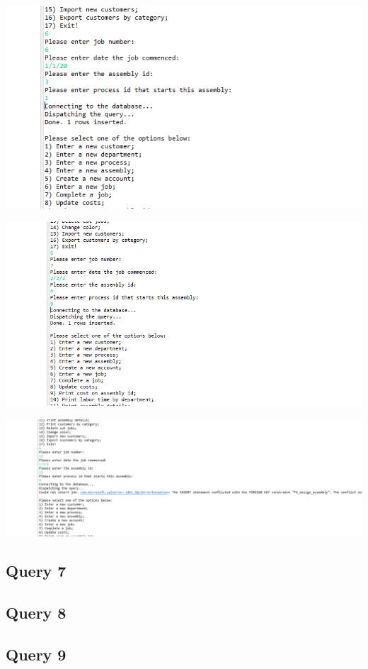 \documentclass[11pt]{article}
\begin{document}
\includegraphics[width = \textwidth]{job2.png}

\includegraphics[width = \textwidth]{job3.png}

\includegraphics[width = \textwidth]{job4.png}
\subsection{Query 7}
\subsection{Query 8}
\subsection{Query 9}
\end{document}
